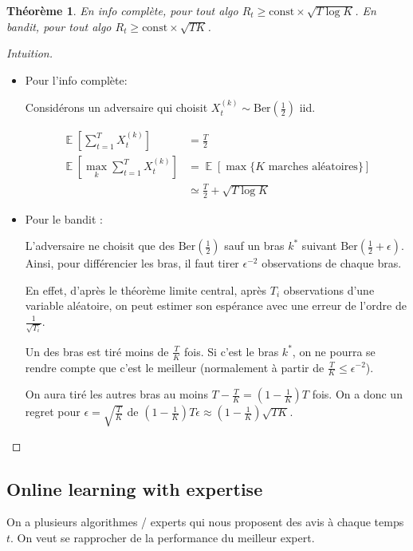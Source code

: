 \documentclass{article}
\DeclareMathOperator*{\E}{\mathbb{E}}
\newtheorem{theorem}{Théorème}[section]
\theoremstyle{remark}
\theoremstyle{remark}
\begin{document}
\begin{theorem}
   En info complète, pour tout algo $R_t \geq \text{const} \times \sqrt{T \log K}$.
   En bandit, pour tout algo $R_t \geq \text{const} \times \sqrt{T K}$.
\end{theorem}

\begin{proof}[Intuition]
   \begin{itemize}
      \item Pour l'info complète:

      Considérons un adversaire qui choisit $X_t^{(k)} \sim \text{Ber}(\frac 1 2)$ iid.

      \begin{align*}
         \E[\sum_{t=1}^T X_t^{(k)}] &= \frac T 2 \\
         \E[\max_k \sum_{t=1}^T X_t^{(k)}] &= \E[\max \{\text{$K$ marches aléatoires}\}] \\
         &\simeq \frac T 2 + \sqrt{T \log K}
      \end{align*}
      \item Pour le bandit :

      L'adversaire ne choisit que des $\text{Ber}(\frac 1 2)$ sauf un bras $k^*$ suivant $\text{Ber}(\frac 1 2 + \epsilon)$.
      Ainsi, pour différencier les bras, il faut tirer $\epsilon^{-2}$ observations de chaque bras.

      En effet, d'après le théorème limite central, après $T_i$ observations d'une variable aléatoire, on peut estimer son espérance avec une erreur de l'ordre de $\frac{1}{\sqrt{T_i}}$.

      Un des bras est tiré moins de $\frac T K$ fois. Si c'est le bras $k^*$, on ne pourra se rendre compte que c'est le meilleur (normalement à partir de $\frac T K \leq \epsilon^{-2}$).

      On aura tiré les autres bras au moins $T - \frac T K = (1- \frac 1 K) T$ fois. On a donc un regret pour $\epsilon = \sqrt{\frac T K}$ de $(1- \frac 1 K) T \epsilon \approx (1 - \frac 1 K) \sqrt{T K}$.
   \end{itemize}
\end{proof}

\subsection{Online learning with expertise}

On a plusieurs algorithmes / experts qui nous proposent des avis à chaque temps $t$. On veut se rapprocher de la performance du meilleur expert.
\end{document}
